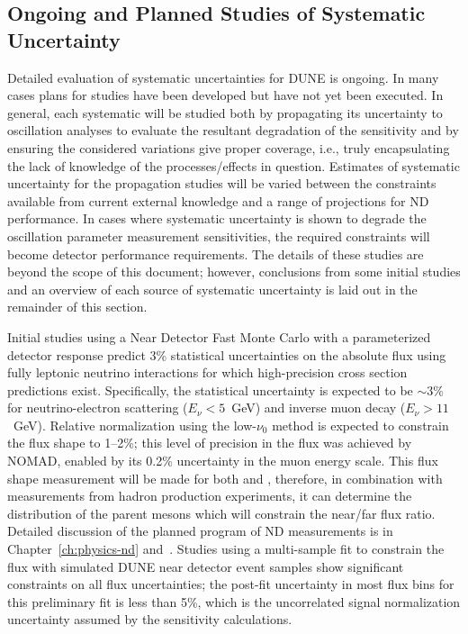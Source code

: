 \subsection{Ongoing and Planned Studies of Systematic Uncertainty}
\label{sec:syst_studies_ind}
Detailed evaluation of systematic uncertainties for DUNE is ongoing. In many cases plans for studies
have been developed but have not yet been executed. In general, each systematic will be studied both by
propagating its uncertainty to oscillation analyses to evaluate the resultant degradation of the sensitivity
and by ensuring the considered variations give proper coverage, i.e., truly encapsulating
the lack of knowledge of the processes/effects in question. Estimates of systematic uncertainty for the 
propagation studies will be varied between the constraints available from current external knowledge
and a range of projections for ND performance. In cases where systematic uncertainty is shown to
degrade the oscillation parameter
measurement sensitivities, the required constraints will become detector performance requirements.
The details of these studies are beyond the scope of this document; however, conclusions from some
initial studies and an overview of each source of systematic uncertainty is laid out in the remainder of
this section.

Initial studies using a Near Detector Fast Monte Carlo with a parameterized detector response
predict 3\% statistical uncertainties on the absolute flux using fully 
leptonic neutrino interactions for which high-precision cross section predictions 
exist. Specifically,
the statistical uncertainty is expected to be $\sim$3\% for neutrino-electron
scattering ($E_\nu<5$~GeV) and inverse muon decay ($E_\nu>11$~GeV).
Relative normalization using the low-$\nu_0$ method is
expected to constrain the flux shape to 1--2\%; this level of
precision in the \numu flux was achieved by NOMAD\cite{Wu:2007ab,Lyubushkin:2008pe}, enabled by its 0.2\%
uncertainty in the muon energy scale. This flux shape measurement will be made for both \nue and \numu, therefore,
in combination with measurements from hadron production experiments, it can determine the distribution of
the parent mesons which will constrain the near/far flux ratio. Detailed discussion of the planned program
of ND measurements is in Chapter~\ref{ch:physics-nd} and~\cite{Mishra:2008nx,Adams:2013qkq}.
Studies using a multi-sample fit  to constrain the flux with simulated DUNE near detector
event samples show significant constraints on all flux
uncertainties; the post-fit uncertainty in most flux bins for this preliminary fit is less
than 5\%, which is the uncorrelated \numu signal normalization
uncertainty assumed by the sensitivity calculations.

